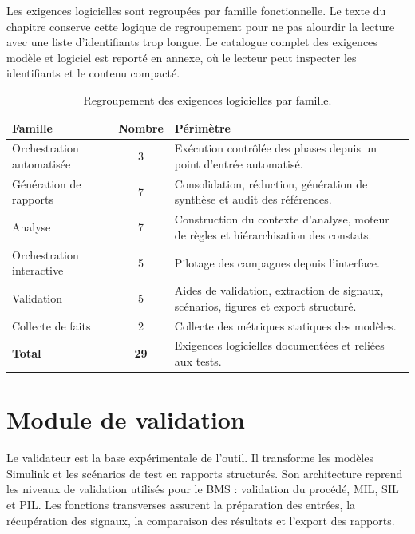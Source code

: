 Les exigences logicielles sont regroupées par famille fonctionnelle. Le texte du chapitre conserve cette logique de regroupement pour ne pas alourdir la lecture avec une liste d'identifiants trop longue. Le catalogue complet des exigences modèle et logiciel est reporté en annexe, où le lecteur peut inspecter les identifiants et le contenu compacté.

\begin{table}[H]
  \centering
  \small
  \begin{tabularx}{\textwidth}{|l|c|X|}
    \hline
    \textbf{Famille} & \textbf{Nombre} & \textbf{Périmètre} \\
    \hline
    Orchestration automatisée & 3 & Exécution contrôlée des phases depuis un point d'entrée automatisé. \\
    \hline
    Génération de rapports & 7 & Consolidation, réduction, génération de synthèse et audit des références. \\
    \hline
    Analyse & 7 & Construction du contexte d'analyse, moteur de règles et hiérarchisation des constats. \\
    \hline
    Orchestration interactive & 5 & Pilotage des campagnes depuis l'interface. \\
    \hline
    Validation & 5 & Aides de validation, extraction de signaux, scénarios, figures et export structuré. \\
    \hline
    Collecte de faits & 2 & Collecte des métriques statiques des modèles. \\
    \hline
    \textbf{Total} & \textbf{29} & Exigences logicielles documentées et reliées aux tests. \\
    \hline
  \end{tabularx}
  \captionsetup{width=0.88\textwidth, skip=15pt}
  \caption{Regroupement des exigences logicielles par famille.}
  \label{tab:ch5_familles_req_sw}
\end{table}

\section{Module de validation}
\label{sec:ch5_validateur}

Le validateur est la base expérimentale de l'outil. Il transforme les modèles Simulink et les scénarios de test en rapports structurés. Son architecture reprend les niveaux de validation utilisés pour le BMS : validation du procédé, MIL, SIL et PIL. Les fonctions transverses assurent la préparation des entrées, la récupération des signaux, la comparaison des résultats et l'export des rapports.

